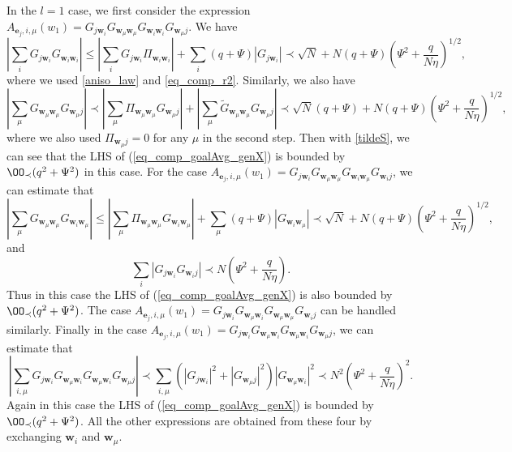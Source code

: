 In the $l=1$ case, we first consider the expression $A_{ \mathbf e_j, i, \mu}(w_1) =  G_{j\mathbf w_i} G_{\mathbf w_\mu \mathbf w_\mu} G_{\mathbf w_i\mathbf w_i} G_{\mathbf w_\mu j}$. We have 
\begin{equation}\nonumber
\left|\sum_i G_{j\mathbf w_i} G_{\mathbf w_i\mathbf w_i}\right| \le \left|\sum_i G_{j\mathbf w_i} \Pi_{\mathbf w_i\mathbf w_i}\right| + \sum_i (q+\Psi)\left| G_{j\mathbf w_i} \right|\prec \sqrt N + N (q+\Psi) \left(\Psi^2 +\frac{q}{N\eta}\right)^{1/2},
\end{equation}
where we used \eqref{aniso_law} and \eqref{eq_comp_r2}.
Similarly, we also have
\begin{equation}\nonumber
 \left|\sum_\mu G_{\mathbf w_\mu\mathbf w_\mu} G_{\mathbf w_\mu j}\right|\prec \left|\sum_\mu {\Pi}_{\mathbf w_\mu \mathbf w_\mu}  G_{\mathbf w_\mu j}\right|  + \left|\sum_\mu \tilde{ G}_{\mathbf w_\mu \mathbf w_\mu}  G_{\mathbf w_\mu j}\right|  \prec \sqrt N(q+\Psi)+N (q+\Psi) \left(\Psi^2 +\frac{q}{N\eta}\right)^{1/2},
\end{equation} 
where we also used $\Pi_{\mathbf w_\mu j}=0$ for any $\mu$ in the second step. Then with \eqref{tildeS}, we can see that the LHS of (\ref{eq_comp_goalAvg_genX}) is bounded by $\OO_\prec(q^2 + \Psi^2)$ in this case.
For the case $A_{ \mathbf e_j, i, \mu}(w_1) =  G_{j\mathbf w_i} G_{\mathbf w_\mu\mathbf w_\mu} G_{\mathbf w_i \mathbf w_\mu} G_{\mathbf w_i j}$, we can estimate that
$$\left|\sum_\mu  G_{\mathbf w_\mu\mathbf w_\mu} G_{\mathbf w_i \mathbf w_\mu} \right| \le \left|\sum_\mu  \Pi_{\mathbf w_\mu\mathbf w_\mu} G_{\mathbf w_i \mathbf w_\mu} \right| + \sum_\mu (q+\Psi)\left|G_{\mathbf w_i \mathbf w_\mu} \right| \prec \sqrt N + N (q+\Psi) \left(\Psi^2 +\frac{q}{N\eta}\right)^{1/2},$$
and
$$ \sum_i \left|G_{j\mathbf w_i} G_{\mathbf w_i j}\right|\prec N\left(\Psi^2 +\frac{q}{N\eta}\right).$$
Thus in this case the LHS of (\ref{eq_comp_goalAvg_genX}) is also bounded by $\OO_\prec(q^2 + \Psi^2)$. The case $A_{ \mathbf e_j, i, \mu}(w_1) =  G_{j\mathbf w_i} G_{\mathbf w_\mu\mathbf w_i} G_{\mathbf w_\mu \mathbf w_\mu} G_{\mathbf w_i j}$ can be handled similarly. Finally in the case $A_{ \mathbf e_j, i, \mu}(w_1) =  G_{j\mathbf w_i} G_{\mathbf w_\mu\mathbf w_i} G_{\mathbf w_\mu \mathbf w_i} G_{\mathbf w_\mu j}$, we can estimate that
$$ \left|\sum_{i,\mu}  G_{j\mathbf w_i} G_{\mathbf w_\mu\mathbf w_i} G_{\mathbf w_\mu \mathbf w_i} G_{\mathbf w_\mu j} \right| \prec  \sum_{i,\mu} \left(\left| G_{j\mathbf w_i}\right|^2 +\left| G_{\mathbf w_\mu j} \right|^2 \right) | G_{\mathbf w_\mu \mathbf w_i}|^2 \prec N^2 \left(\Psi^2 +\frac{q}{N\eta}\right)^2.$$
Again in this case the LHS of (\ref{eq_comp_goalAvg_genX}) is bounded by $\OO_\prec(q^2 + \Psi^2)$. All the other expressions are obtained from these four by exchanging $\mathbf w_i$ and $\mathbf w_\mu$.

